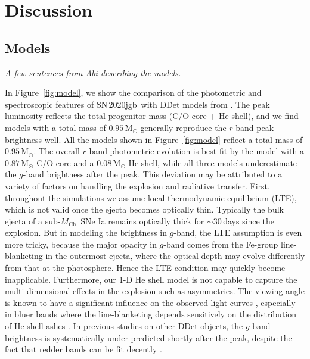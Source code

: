 \documentclass[twocolumn]{aastex631}
\newcommand{\sn}{SN\,2020jgb}
\newcommand{\Mch}{$M_\mathrm{Ch}$}
\begin{document}
\section{Discussion} \label{sec:discussion}
\subsection{Models} \label{sec:model}
{\it A few sentences from Abi describing the models.}

In Figure~\ref{fig:model}, we show the comparison of the photometric and spectroscopic features of \sn\ with DDet models from \citet{polin_observational_2019}. The peak luminosity reflects the total progenitor mass (C/O core $+$ He shell), and we find models with a total mass of $0.95\,\mathrm{M_\odot}$ generally reproduce the $r$-band peak brightness well. All the models shown in Figure~\ref{fig:model} reflect a total mass of $0.95\,\mathrm{M_\odot}$. The overall $r$-band photometric evolution is best fit by the model with a $0.87\,\mathrm{M_\odot}$ C/O core and a $0.08\,\mathrm{M_\odot}$ He shell, while all three models underestimate the $g$-band brightness after the peak. This deviation may be attributed to a variety of factors on handling the explosion and radiative transfer. First, throughout the simulations we assume local thermodynamic equilibrium (LTE), which is not valid once the ejecta becomes optically thin. Typically the bulk ejecta of a sub-\Mch\ SNe Ia remains optically thick for $\sim$30\,days since the explosion. But in modeling the brightness in $g$-band, the LTE assumption is even more tricky, because the major opacity in $g$-band comes from the Fe-group line-blanketing in the outermost ejecta, where the optical depth may evolve differently from that at the photosphere. Hence the LTE condition may quickly become inapplicable. Furthermore, our 1-D He shell model is not capable to capture the multi-dimensional effects in the explosion such as asymmetries. The viewing angle is known to have a significant influence on the observed light curves \citep{Kromer_DD_2010, Sim_2012, Gronow_2020, Shen_2021}, especially in bluer bands where the line-blanketing depends sensitively on the distribution of He-shell ashes \citep{Shen_2021}. In previous studies on other DDet objects, the $g$-band brightness is systematically under-predicted shortly after the peak, despite the fact that redder bands can be fit decently \citep[e.g.,][]{jiang_16jhr_2017,jacobson-galan_16hnk_2020}.
\end{document}
